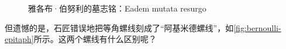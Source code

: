 \documentclass[b5paper]{ctexart}
\begin{document}
\begin{figure}[htbp]
 \centering
 \caption{雅各布·伯努利的墓志铭：Eadem mutata resurgo}
\end{figure}

但遗憾的是，石匠错误地把等角螺线刻成了“阿基米德螺线”，如\cref{fig:bernoulli-epitaph}所示。这两个螺线有什么区别呢？
\end{document}
